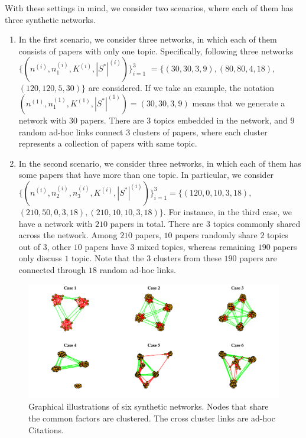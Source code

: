 \documentclass[AMS,STIX1COL]{WileyNJD-v2}
\begin{document}
{With these settings in mind, we consider two scenarios, where each of them has three synthetic networks.

\begin{enumerate}
    \item In the first scenario, we consider three networks, in which each of them consists of papers with only one topic.
        Specifically, following three networks
        $\{(n^{(i)},n_{1}^{(i)},K^{(i)},|S^*|^{(i)})\}_{i=1}^{3}$ $=\{(30,30,3,9), (80,80,4,18),$ $(120,120,5,30)\}$ are considered.
        If we take an example, the notation  $(n^{(1)},n_{1}^{(1)},K^{(1)},|S^*|^{(1)})=(30,30,3,9)$ means that we generate a network with $30$ papers. There are $3$ topics embedded in the network, and $9$ random ad-hoc links connect $3$ clusters of papers, where each cluster represents a collection of papers with same topic.

    \item In the second scenario, we consider three networks, in which each of them has some papers that have more than one topic.
        In particular, we consider $\{(n^{(i)},n_{2}^{(i)},n_{3}^{(i)},K^{(i)},|S^{*}|^{(i)})\}_{i=1}^{3}=
        \{(120,0,10,3,18),$ $(210,50,0,3,18),(210,10,10,3,18)\}$.
        For instance, in the third case, we have a network with $210$ papers in total. There are $3$ topics commonly shared across the network.
        Among $210$ papers, $10$ papers randomly share $2$ topics out of $3$, other $10$ papers have $3$ mixed topics, whereas remaining $190$ papers only discuss $1$ topic.
        Note that the $3$ clusters from these $190$ papers are connected through $18$ random ad-hoc links.
\end{enumerate}

\begin{figure}[htbp]
\includegraphics[width=1\textwidth]{Fig1.pdf}
\caption{Graphical illustrations of six synthetic networks.
Nodes that share the common factors are clustered. The cross cluster links are ad-hoc Citations.}
\label{fig:figure1}
\end{figure}

}
\end{document}
